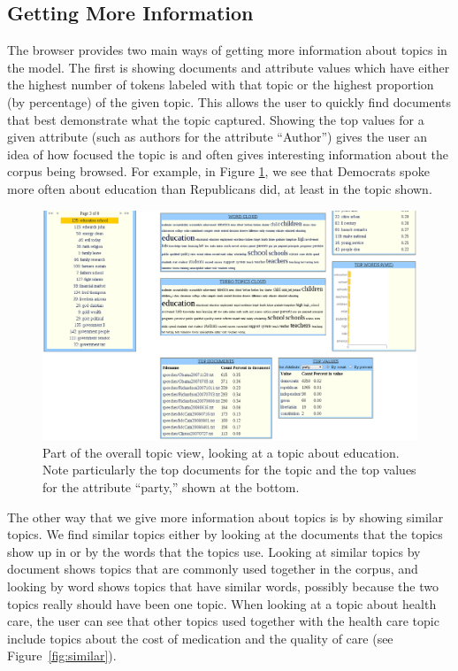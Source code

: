 \documentclass{article}
\begin{document}
\subsection{Getting More Information}

The browser provides two main ways of getting more information about topics in
the model.  The first is showing documents and attribute values which have
either the highest number of tokens labeled with that topic or the highest
proportion (by percentage) of the given topic.  This allows the user to quickly
find documents that best demonstrate what the topic captured.  Showing the top
values for a given attribute (such as authors for the attribute ``Author'')
gives the user an idea of how focused the topic is and often gives interesting
information about the corpus being browsed.  For example, in Figure
\ref{fig:top-values}, we see that Democrats spoke more often about education
than Republicans did, at least in the topic shown.

\begin{figure}
  \centering
  \includegraphics[width=\textwidth]{top_values}
  \caption{Part of the overall topic view, looking at a topic about education.
  Note particularly the top documents for the topic and the top values for the
  attribute ``party,'' shown at the bottom.}
  \label{fig:top-values}
\end{figure}

The other way that we give more information about topics is by showing similar
topics.  We find similar topics either by looking at the documents that the
topics show up in or by the words that the topics use.  Looking at similar
topics by document shows topics that are commonly used together in the corpus,
and looking by word shows topics that have similar words, possibly because the
two topics really should have been one topic.  When looking at a topic about
health care, the user can see that other topics used together with the health
care topic include topics about the cost of medication and the quality of care
(see Figure~\ref{fig:similar}).
\end{document}
